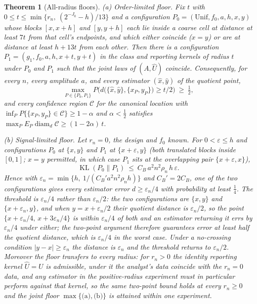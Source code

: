\documentclass[11pt]{article}
\newtheorem{theorem}{Theorem}[section]
\theoremstyle{definition}
\newcommand{\1}{\mathbf 1}\newcommand{\op}{\operatorname}
\begin{document}
\begin{theorem}[All-radius floors]\label{thm:S-allradius}
\textup{(a)} \emph{Order-limited floor.}  Fix $t$ with
$0\le t\le\min\{r_n,\ (2^{-J_0}-h)/13\}$ and a configuration
$P_0=(\mathrm{Unif},f_0,a,h,x,y)$ whose blocks $[x,x+h]$ and
$[y,y+h]$ each lie inside a coarse cell at distance at least $7t$ from that
cell's endpoints, and which either coincide ($x=y$) or are at distance at least
$h+13t$ from each other.  Then there is a configuration
$P_1=(g_1,f_0,a,h,x+t,y+t)$ in the class and reporting kernels of radius $t$
under $P_0$ and $P_1$ such that the joint laws of $(A,\widehat U)$ coincide.
Consequently, for every $n$, every amplitude $a$, and every estimator
$(\widehat x,\widehat y)$ of the quotient point,
\[
\max_{P\in\{P_0,P_1\}}P\bigl(d\bigl(\{\widehat x,\widehat y\},\{x_P,y_P\}\bigr)\ge t/2\bigr)\ \ge\ \tfrac12,
\]
and every confidence region $\mathcal C$ for the canonical location with
$\inf_PP\{\{x_P,y_P\}\in\mathcal C\}\ge1-\alpha$ and $\alpha<\tfrac12$
satisfies $\max_PE_P\operatorname{diam}_d\mathcal C\ge(1-2\alpha)\,t$.

\textup{(b)} \emph{Signal-limited floor.}  Let $r_n=0$, the design and $f_0$
known.  For $0<\varepsilon\le h$ and configurations $P_0$ at $\{x,y\}$ and
$P_1$ at $\{x+\varepsilon,y\}$ (both translated blocks inside $[0,1]$; $x=y$
permitted, in which case $P_1$ sits at the overlapping pair
$\{x+\varepsilon,x\}$),
\[
\operatorname{KL}(P_0\|P_1)\ \le\ C_B\,a^2n^2\rho_n\,h\,\varepsilon .
\]
Hence with $\varepsilon_n=\min\{h,\ 1/(C_B'a^2n^2\rho_nh)\}$ and $C_B'=2C_B$,
one of the two configurations gives every estimator error
$d\ge\varepsilon_n/4$ with probability at least $\tfrac14$.  The threshold is
$\varepsilon_n/4$ rather than $\varepsilon_n/2$: the two configurations are
$\{x,y\}$ and $\{x+\varepsilon_n,y\}$, and when $y=x+\varepsilon_n/2$ their
quotient distance is $\varepsilon_n/2$, so the point $\{x+\varepsilon_n/4,\,
x+3\varepsilon_n/4\}$ is within $\varepsilon_n/4$ of both and an estimator
returning it errs by $\varepsilon_n/4$ under either; the two-point argument
therefore guarantees error at least half the quotient distance, which is
$\varepsilon_n/4$ in the worst case.  Under a no-crossing condition
$|y-x|\ge\varepsilon_n$ the distance is $\varepsilon_n$ and the threshold
returns to $\varepsilon_n/2$.
Moreover the floor transfers to every radius: for $r_n>0$ the identity
reporting kernel $\widehat U=U$ is admissible, under it the analyst's data
coincide with the $r_n=0$ data, and any estimator in the positive-radius
experiment must in particular perform against that kernel, so the same
two-point bound holds at every $r_n\ge0$ and the joint floor
$\max\{\text{(a)},\text{(b)}\}$ is attained within one experiment.
\end{theorem}
\end{document}
